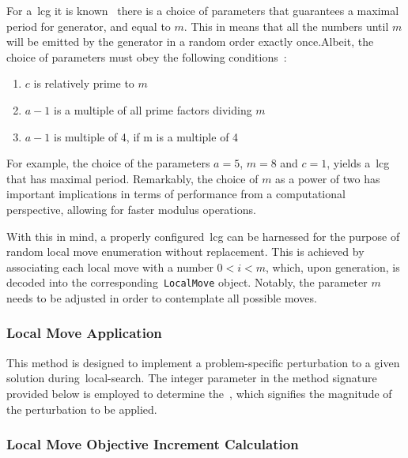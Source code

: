 For a~\acrshort{lcg} it is known~\cite{knuth2014art} there is a choice of
parameters that guarantees a maximal period for generator, and equal to $m$.
This in means that all the numbers until $m$ will be emitted by the generator in
a random order exactly once.Albeit, the choice of parameters must obey the
following conditions~\cite{knuth2014art}:

\begin{enumerate}
  \item $c$ is relatively prime to $m$
  \item $a - 1$ is a multiple of all prime factors dividing $m$
  \item $a - 1$ is multiple of 4, if m is a multiple of 4
\end{enumerate}

For example, the choice of the parameters $a = 5$, $m = 8$ and $c = 1$, yields
a~\acrshort{lcg} that has maximal period. Remarkably, the choice of $m$ as a
power of two has important implications in terms of performance from a
computational perspective, allowing for faster modulus operations.

With this in mind, a properly configured~\acrshort{lcg} can be harnessed for the
purpose of random local move enumeration without replacement. This is achieved
by associating each local move with a number $0 < i < m$, which, upon
generation, is decoded into the corresponding~\texttt{LocalMove} object.
Notably, the parameter $m$ needs to be adjusted in order to contemplate all
possible moves.

\subsubsection*{Local Move Application}

This method is designed to implement a problem-specific perturbation to a given
solution during~\acrshort{local-search}. The integer parameter in the method
signature provided below is employed to determine the~,
which signifies the magnitude of the perturbation to be applied.

\begin{center}
\end{center}

\subsubsection*{Local Move Objective Increment Calculation}

